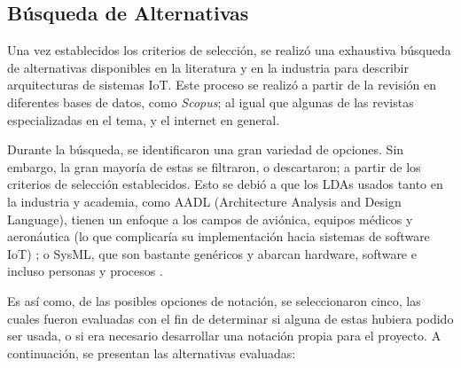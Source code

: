 
\subsection{Búsqueda de Alternativas}

Una vez establecidos los criterios de selección, se realizó una exhaustiva búsqueda de alternativas disponibles en la literatura y en la industria para describir arquitecturas de sistemas IoT. Este proceso se realizó a partir de la revisión en diferentes bases de datos, como \textit{Scopus}; al igual que algunas de las revistas especializadas en el tema, y el internet en general.

Durante la búsqueda, se identificaron una gran variedad de opciones. Sin embargo, la gran mayoría de estas se filtraron, o descartaron; a partir de los criterios de selección establecidos. Esto se debió a que los LDAs usados tanto en la industria y academia, como AADL (Architecture Analysis and Design Language), tienen un enfoque a los campos de aviónica, equipos médicos y aeronáutica (lo que complicaría su implementación hacia sistemas de software IoT) \cite{aadl_web, aadl_pdf}; o SysML, que son bastante genéricos y abarcan hardware, software e incluso personas y procesos \cite{omgsysml_2015}.

Es así como, de las posibles opciones de notación, se seleccionaron cinco, las cuales fueron evaluadas con el fin de determinar si alguna de estas hubiera podido ser usada, o si era necesario desarrollar una notación propia para el proyecto. A continuación, se presentan las alternativas evaluadas:


